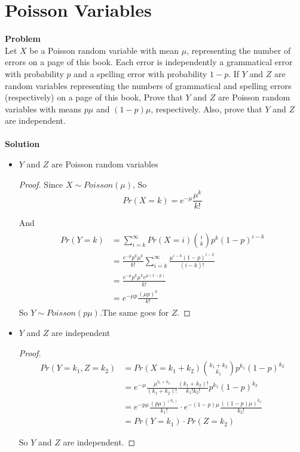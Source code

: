 	\section{Poisson Variables}
	\textbf{Problem}\\
	Let $X$ be a Poisson random variable with mean $\mu$, representing the number of errors on a
	page of this book. Each error is independently a grammatical error with probability $p$ and
	a spelling error with probability $1-p$. If $Y$ and $Z$ are random variables representing the
	numbers of grammatical and spelling errors (respectively) on a page of this book, Prove
	that $Y$ and $Z$ are Poisson random variables with means $p\mu$ and $(1-p)\mu$, respectively.
	Also, prove that $Y$ and $Z$ are independent.\\\\
	\textbf{Solution}\\
	\begin{itemize}  
		\item $Y$ and $Z$ are Poisson random variables\\
		\begin{proof}
			Since $X \sim Poisson(\mu)$, So
			\begin{equation*}
				Pr(X=k) = e^{-\mu} \frac{\mu^k}{k!}
			\end{equation*}
			
			And
			\begin{eqnarray*}
				\begin{split}
					Pr(Y=k) 
					&= \sum_{i=k}^{\infty} Pr(X=i) \binom{i}{k} p^k (1-p)^{i-k} \\
					&= \frac{e^{-\mu} p^k \mu^k}{k!} \sum_{i=k}^{\infty} \frac{\mu^{i-k}(1-p)^{i-k}}{(i-k)!} \\
					&= \frac{e^{-\mu} p^k \mu^k e^{\mu(1-p)}}{k!} \\
					&= e^{-\mu p}\frac{(\mu p)^k}{k!}
				\end{split}
			\end{eqnarray*}
			So $Y \sim Poisson(p\mu)$.The same goes for $Z$.
		\end{proof}
		
		\item $Y$ and $Z$ are independent
		
			\begin{proof}
				\begin{equation*}
				\begin{split}
					Pr(Y=k_1, Z=k_2) 
					&= Pr(X=k_1+k_2) \binom{k_1+k_2}{k_1} p^{k_1} (1-p)^{k_2} \\
					&= e^{-\mu} \frac{\mu^{k_1+k_2}}{(k_1+k_2)!} \frac{(k_1+k_2)!}{k_1! k_2!} p^{k_1} (1-p)^{k_2}\\
					&= e^{-p\mu} \frac{(p\mu)^(k_1)}{k_1!} \cdot e^{-(1-p)\mu} \frac{((1-p)\mu)^{k_2}}{k_2!} \\
					&= Pr(Y=k_1) \cdot Pr(Z=k_2)
				\end{split}
			\end{equation*}
			
			So $Y$ and $Z$ are independent.
			\end{proof}
	\end{itemize} 
	

